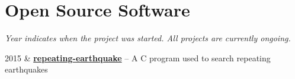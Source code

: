 \section{Open Source Software}

\emph{Year indicates when the project was started. All projects are currently ongoing.}

\begin{EntriesTable}{0.05}{0.02}{0.93}
2015 &	\textbf{\href{https://github.com/core-man/repeating-earthquake/}{repeating-earthquake}} -- A C program used to search repeating earthquakes \\
\end{EntriesTable}
